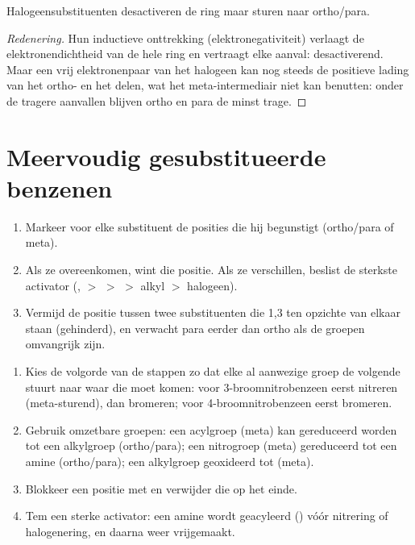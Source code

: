 \begin{proposition}[Halogenen]\label{prop:b2:aromatic-substitution:halogens}
Halogeensubstituenten desactiveren de ring maar sturen naar ortho/para.
\end{proposition}

\begin{proof}[Redenering]
Hun inductieve onttrekking (elektronegativiteit) verlaagt de elektronendichtheid van de hele ring
en vertraagt elke aanval: desactiverend. Maar een vrij elektronenpaar van het halogeen kan nog steeds de
positieve lading van het ortho- en het  delen, wat het meta-intermediair niet
kan benutten: onder de tragere aanvallen blijven ortho en para de minst trage.
\end{proof}

\section{Meervoudig gesubstitueerde benzenen}

\begin{method}\label{met:b2:aromatic-substitution:predict-position}
\begin{enumerate}
  \item Markeer voor elke substituent de posities die hij begunstigt (ortho/para of meta).
  \item Als ze overeenkomen, wint die positie. Als ze verschillen, beslist de sterkste activator
        (,  $>$  $>$  $>$ alkyl $>$ halogeen).
  \item Vermijd de positie tussen twee substituenten die 1,3 ten opzichte van elkaar staan (gehinderd), en
        verwacht para eerder dan ortho als de groepen omvangrijk zijn.
\end{enumerate}
\end{method}

\begin{method}\label{met:b2:aromatic-substitution:plan-aromatic}
\begin{enumerate}
  \item Kies de volgorde van de stappen zo dat elke al aanwezige groep de volgende stuurt
        naar waar die moet komen: voor 3-broomnitrobenzeen eerst nitreren (meta-sturend), dan
        bromeren; voor 4-broomnitrobenzeen eerst bromeren.
  \item Gebruik omzetbare groepen: een acylgroep (meta) kan gereduceerd worden tot een alkylgroep (ortho/para);
        een nitrogroep (meta) gereduceerd tot een amine (ortho/para); een alkylgroep geoxideerd tot
         (meta).
  \item Blokkeer een positie met  en verwijder die op het einde.
  \item Tem een sterke activator: een amine wordt geacyleerd () vóór nitrering of
        halogenering, en daarna weer vrijgemaakt.
\end{enumerate}
\end{method}

